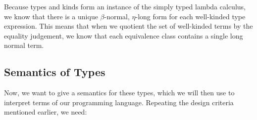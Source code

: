 \documentclass[12pt]{article}
\begin{document}

Because types and kinds form an instance of the simply typed lambda
calculus, we know that there is a unique $\beta$-normal, $\eta$-long
form for each well-kinded type expression. This means that when we
quotient the set of well-kinded terms by the equality judgement, we
know that each equivalence class contains a single long normal term.

\subsection{Semantics of Types}

Now, we want to give a semantics for these types, which we will then
use to interpret terms of our programming language. Repeating the
design criteria mentioned earlier, we need: 
\end{document}
